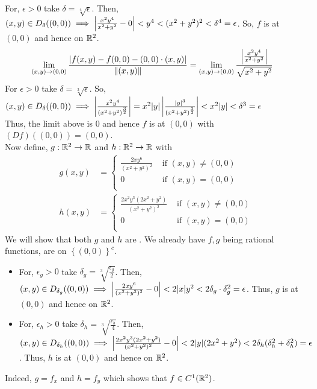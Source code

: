 \begin{soln}{4}
For, $ \epsilon > 0 $ take $ \delta = \sqrt[4]{\epsilon} $. Then, $ (x,y) \in D_{\delta}((0,0)) \implies \left| {\frac{x^2y^4}{x^2+y^2}-0} \right| < y^4 < (x^2+y^2)^2 < \delta^4 = \epsilon $. So, $ f $ is \cts at $ (0,0) $ and hence on $ \mathbb{R}^2 $.
 \\ 
\begin{align*}
  \lim_{(x,y) \to (0,0)} \frac{\left| {f(x,y)-f(0,0)-(0,0)\cdot (x,y)} \right|}{\norm{(x,y)}}
  &= \lim_{(x,y) \to (0,0)} \frac{\left| { \frac{x^2y^4}{x^2+y^2} } \right|}{\sqrt{x^2+y^2}}
\end{align*}
For $ \epsilon > 0 $ take $ \delta = \sqrt[3]{\epsilon} $. So, $ (x,y) \in D_{\delta}((0,0)) \implies \left| { \frac{x^2y^4}{(x^2+y^2)^{\frac{3}{2}}} } \right| = x^2|y|\left| { \frac{ |y|^3}{(x^2+y^2)^{\frac{3}{2}}} } \right| < x^2|y| < \delta^3 = \epsilon $
 \\ 
Thus, the limit above is $ 0 $ and hence $ f $ is \diff at $ (0,0) $ with $ (Df)((0,0)) = (0,0) $.
 \\ 
Now define, $ g:\mathbb{R}^2 \to \mathbb{R} $ and $ h:\mathbb{R}^2 \to \mathbb{R} $ with \begin{align*}
    g(x,y) &= \begin{cases}
      \frac{2xy^6}{(x^2+y^2)^2} &\text{ if } (x,y)\not=(0,0) \\ 
      0 &\text{ if } (x,y)=(0,0) \\ 
    \end{cases} \\ 
    h(x,y) &= \begin{cases}
      \frac{2x^2y^3(2x^2+y^2)}{(x^2+y^2)^2} &\text{ if } (x,y)\not=(0,0) \\ 
      0 &\text{ if } (x,y)=(0,0) \\ 
    \end{cases}
   \end{align*}
   We will show that both $ g $ and $ h $ are \cts. We already have $ f,g $ being rational functions, are \cts  on $ \left\{ (0,0) \right\}^c $.
   \begin{itemize}
    \item For, $ \epsilon_g > 0 $ take $ \delta_g = \sqrt[3]{\frac{\epsilon_g}{2}} $. Then,  $ (x,y) \in D_{\delta_g}((0,0)) \implies \left| {\frac{2xy^6}{(x^2+y^2)^2}-0} \right| < 2|x|y^2 < 2\delta_g\cdot \delta_g^2 = \epsilon $. Thus, $ g $ is \cts at $ (0,0) $ and hence on $ \mathbb{R}^2 $.
    \item For, $ \epsilon_h > 0 $ take $ \delta_h = \sqrt[3]{\frac{\epsilon_h}{4}} $. Then,  $ (x,y) \in D_{\delta_h}((0,0)) \implies \left| {\frac{2x^2y^3(2x^2+y^2)}{(x^2+y^2)^2}-0} \right| < 2|y|(2x^2+y^2) < 2\delta_h(\delta_h^2 + \delta_h^2) = \epsilon $. Thus, $ h $ is \cts at $ (0,0) $ and hence on $ \mathbb{R}^2 $.
   \end{itemize}
   Indeed, $ g = f_x $ and $ h = f_y $ which shows that $ f \in C^{1}(\mathbb{R}^2) $.
\end{soln}